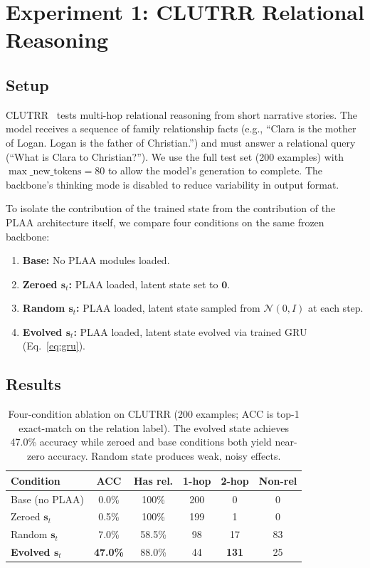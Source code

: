 \documentclass[11pt,a4paper]{article}
\begin{document}
\section{Experiment 1: CLUTRR Relational Reasoning}
\label{sec:clutrr}

\subsection{Setup}

CLUTRR~\cite{sinha2019clutrr} tests multi-hop relational reasoning from short narrative stories. The model receives a sequence of family relationship facts (e.g., ``Clara is the mother of Logan. Logan is the father of Christian.'') and must answer a relational query (``What is Clara to Christian?''). We use the full test set (200 examples) with $\max\_\text{new\_tokens} = 80$ to allow the model's generation to complete. The backbone's thinking mode is disabled to reduce variability in output format.

To isolate the contribution of the trained state from the contribution of the PLAA architecture itself, we compare four conditions on the same frozen backbone:

\begin{enumerate}
    \item \textbf{Base:} No PLAA modules loaded.
    \item \textbf{Zeroed $\mathbf{s}_t$:} PLAA loaded, latent state set to $\mathbf{0}$.
    \item \textbf{Random $\mathbf{s}_t$:} PLAA loaded, latent state sampled from $\mathcal{N}(0, I)$ at each step.
    \item \textbf{Evolved $\mathbf{s}_t$:} PLAA loaded, latent state evolved via trained GRU (Eq.~\ref{eq:gru}).
\end{enumerate}

\subsection{Results}

\begin{table}[t]
\centering
\caption{Four-condition ablation on CLUTRR (200 examples; ACC is top-1 exact-match on the relation label). The evolved state achieves 47.0\% accuracy while zeroed and base conditions both yield near-zero accuracy. Random state produces weak, noisy effects.}
\label{tab:clutrr_four}
\begin{tabular}{@{}lccccc@{}}
\toprule
Condition & ACC & Has rel. & 1-hop & 2-hop & Non-rel \\
\midrule
Base (no PLAA) & 0.0\% & 100\% & 200 & 0 & 0 \\
Zeroed $\mathbf{s}_t$ & 0.5\% & 100\% & 199 & 1 & 0 \\
Random $\mathbf{s}_t$ & 7.0\% & 58.5\% & 98 & 17 & 83 \\
\textbf{Evolved $\mathbf{s}_t$} & \textbf{47.0\%} & 88.0\% & 44 & \textbf{131} & 25 \\
\bottomrule
\end{tabular}
\end{table}
\end{document}
